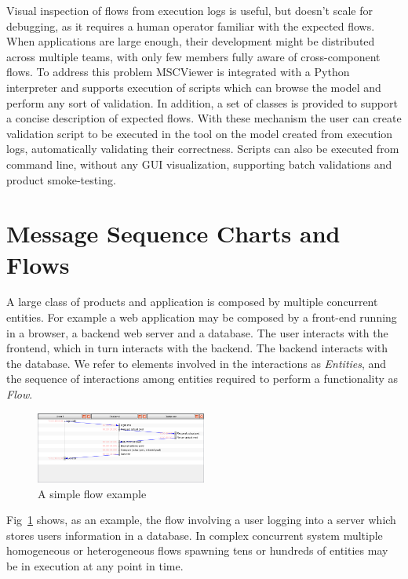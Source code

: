 \documentclass[11pt, twoside, titlepage]{book}
\newcommand{\prog}{MSCViewer}
\newcommand{\defterm}[1]{\textit{#1}\index{#1}}
\begin{document}
Visual inspection of flows from execution logs is useful, but doesn't scale for
debugging, as it requires a human operator familiar with the expected flows.
When applications are large enough, their development might be distributed
across multiple teams, with only few members fully aware of cross-component
flows. To address this problem \prog{} is integrated with a Python interpreter
and supports execution of scripts which can browse the model and perform any
sort of validation. In addition, a set of classes is provided to support a
concise description of expected flows. With these mechanism the user can create
validation script to be executed in the tool on the model created from execution
logs, automatically validating their correctness. Scripts can also be executed
from command line, without any GUI visualization, supporting batch validations
and product smoke-testing.

\section{Message Sequence Charts and Flows}
A large class of products and application is composed by multiple concurrent
entities. For example a web application may be composed by a front-end running
in a browser, a backend web server and a database. The user interacts with the 
frontend, which in turn interacts with the backend. The backend interacts with
the database. We refer to elements involved in the interactions as 
\defterm{Entities}, and the sequence of interactions among entities required to
perform a functionality as \defterm{Flow}. 

\begin{figure}[ht!]
  \centering
  \includegraphics[width=0.5\textwidth,natwidth=1024,natheight=600]{images/simple-flow.png}
  \caption{A simple flow example}
  \label{fig:simple-flow} 
\end{figure}  
 
Fig~\ref{fig:simple-flow} shows, as an example, the flow involving a user
logging into a server which stores users information in a database. 
In complex concurrent system multiple homogeneous or heterogeneous flows
spawning tens or hundreds of entities may be in execution at any point in time.  
  
\end{document}
